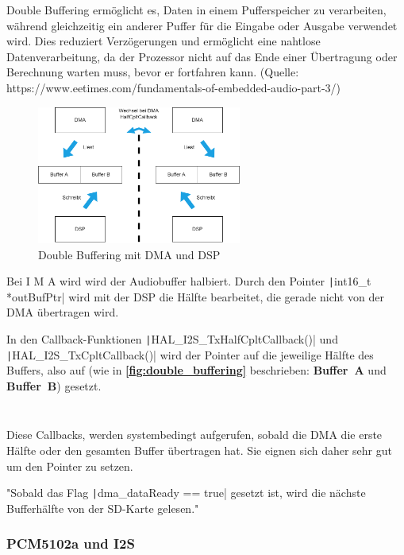 Double Buffering ermöglicht es, Daten in einem Pufferspeicher zu verarbeiten, während gleichzeitig ein anderer Puffer für die Eingabe oder Ausgabe verwendet wird. Dies reduziert Verzögerungen und ermöglicht eine nahtlose Datenverarbeitung, da der Prozessor nicht auf das Ende einer Übertragung oder Berechnung warten muss, bevor er fortfahren kann. (Quelle: https://www.eetimes.com/fundamentals-of-embedded-audio-part-3/)

\begin{figure}[H]
	\centering
	\includegraphics[width=0.6\textwidth]{images/08_durchfuehrung/audio/double_buffering.drawio.png}
	\caption{Double Buffering mit DMA und DSP}
	\label{fig:double_buffering}
\end{figure}


Bei I M A wird wird der Audiobuffer halbiert. %
Durch den Pointer \texttt|int16_t *outBufPtr| wird mit der DSP die Hälfte bearbeitet, die gerade nicht von der DMA übertragen wird.

In den Callback-Funktionen \texttt|HAL_I2S_TxHalfCpltCallback()| und \texttt|HAL_I2S_TxCpltCallback()| wird der Pointer auf die jeweilige Hälfte des Buffers, also auf (wie in  \textbf{\autoref{fig:double_buffering}} beschrieben:
\textbf{Buffer~A} und \textbf{Buffer~B}) gesetzt.


\inputminted[firstline=28, lastline=31]{c}{../../f401_sd_card_audio_codec_test/Core/Src/audio.c}

\inputminted[firstline=40, lastline=43]{c}{../../f401_sd_card_audio_codec_test/Core/Src/audio.c}


Diese Callbacks, werden systembedingt aufgerufen, sobald die DMA die erste Hälfte oder den gesamten Buffer übertragen hat. Sie eignen sich daher sehr gut um den Pointer zu setzen.

"Sobald das Flag \texttt|dma_dataReady == true| gesetzt ist, wird die nächste Bufferhälfte von der SD-Karte gelesen."

\subsubsection{PCM5102a und I2S}

